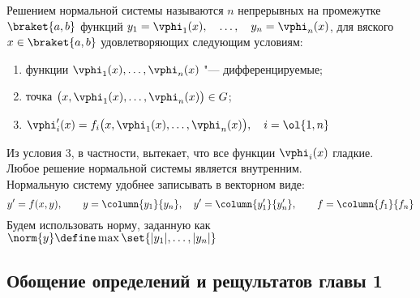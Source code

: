 \begin{definition}
    Решением нормальной системы  называются $ n $ непрерывных на промежутке $ \braket{a, b} $ функций $ y_1 = \vphi_1(x), \quad \dots, \quad y_n = \vphi_n(x) $, для вяского $ x \in \braket{a, b} $ удовлетворяющих следующим условиям:
    \begin{enumerate}
    	\item функции $ \vphi_1(x), \dots, \vphi_n(x) $ "--- дифференцируемые;
        \item точка $ \big( x, \vphi_1(x), \dots, \vphi_n(x) \big) \in G $;
        \item $ \vphi_i'(x) = f_i \big( x, \vphi_1(x), \dots, \vphi_n(x) \big), \quad i = \ol{1, n} $
    \end{enumerate}
\end{definition}

Из условия 3, в частности, вытекает, что все функции $ \vphi_i(x) $ гладкие. \\
Любое решение нормальной системы является внутренним. \\
Нормальную систему удобнее записывать в векторном виде:
$$ y' = f(x, y), \qquad y = \column{y_1}{y_n}, \quad y' = \column{y_1'}{y_n'}, \qquad f = \column{f_1}{f_n} $$
Будем использовать норму, заданную как $ \norm{y} \define \max\set{|y_1|, \dots, |y_n|} $

\subsection{Обощение определений и рещультатов главы 1}

